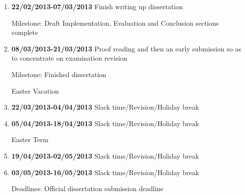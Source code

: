 \begin{enumerate}
\item {\bf 22/02/2013-07/03/2013} Finish writing up dissertation

Milestone: Draft Implementation, Evaluation and Conclusion sections complete

\item {\bf 08/03/2013-21/03/2013} Proof reading and then an early submission so as to concentrate on examination revision

Milestone: Finished dissertation

Easter Vacation
\item {\bf 22/03/2013-04/04/2013} Slack time/Revision/Holiday break

\item {\bf 05/04/2013-18/04/2013} Slack time/Revision/Holiday break

Easter Term
\item {\bf 19/04/2013-02/05/2013} Slack time/Revision/Holiday break

\item {\bf 03/05/2013-16/05/2013} Slack time/Revision/Holiday break

Deadlines: Official dissertation submission deadline

\end{enumerate}
